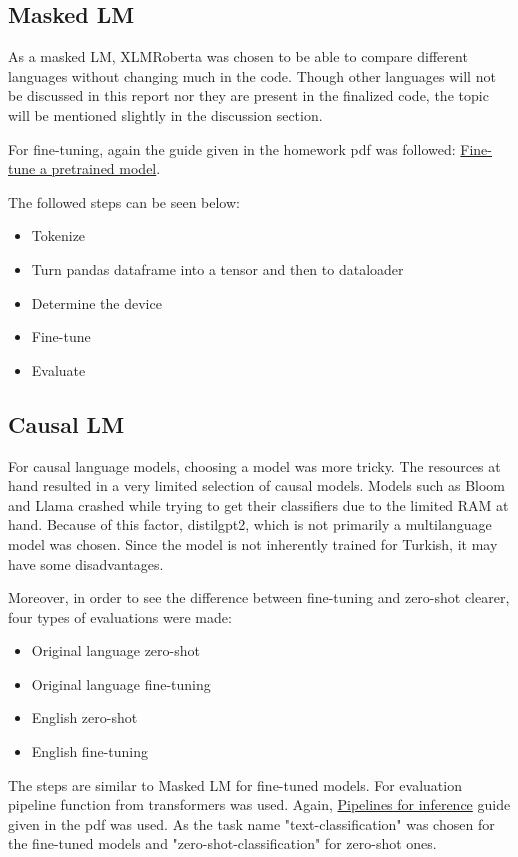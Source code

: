 \documentclass[
]{ceurart}
\begin{document}
\subsection{Masked LM}
As a masked LM, XLMRoberta was chosen to be able to compare different languages without changing much in the code. Though other languages will not be discussed in this report nor they are present in the finalized code, the topic will be mentioned slightly in the discussion section.

For fine-tuning, again the guide given in the homework pdf was followed: \href{https://huggingface.co/docs/transformers/training}{Fine-tune a pretrained model}. 

The followed steps can be seen below:
\begin{itemize}
    \item Tokenize
    \item Turn pandas dataframe into a tensor and then to dataloader
    \item Determine the device
    \item Fine-tune
    \item Evaluate
\end{itemize}

\subsection{Causal LM}

For causal language models, choosing a model was more tricky. The resources at hand resulted in a very limited selection of causal models. Models such as Bloom and Llama crashed while trying to get their classifiers due to the limited RAM at hand. Because of this factor, distilgpt2, which is not primarily a multilanguage model was chosen. Since the model is not inherently trained for Turkish, it may have some disadvantages. 

Moreover, in order to see the difference between fine-tuning and zero-shot clearer, four types of evaluations were made:
\begin{itemize}
    \item Original language zero-shot
    \item Original language fine-tuning
    \item English zero-shot
    \item English fine-tuning
\end{itemize}

The steps are similar to Masked LM for fine-tuned models. For evaluation pipeline function from transformers was used. Again, \href{https://huggingface.co/docs/transformers/pipeline_tutorial##text-pipeline}{Pipelines for inference} guide given in the pdf was used. As the task name "text-classification" was chosen for the fine-tuned models and "zero-shot-classification" for zero-shot ones.
\end{document}
